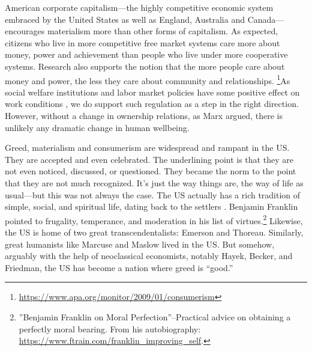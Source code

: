 \documentclass[10pt, letterpaper]{article}
\providecommand{\DIFaddtex}[1]{{\protect\color{blue}\uwave{#1}}} %
\providecommand{\DIFaddbegin}{} %
\providecommand{\DIFaddend}{} %
\providecommand{\DIFadd}[1]{\texorpdfstring{\DIFaddtex{#1}}{#1}} %
\newcommand{\DIFaddincludegraphics}[2][]{{\color{blue}\fbox{\DIFOincludegraphics[#1]{#2}}}} %
\DeclareRobustCommand{\DIFaddbegin}{\DIFOaddbegin \let\includegraphics\DIFaddincludegraphics} %
\DeclareRobustCommand{\DIFaddend}{\DIFOaddend \let\includegraphics\DIFOincludegraphics} %
\begin{document}
\begin{spacing}{1.8}
American corporate capitalism---the highly competitive economic system embraced by the United States as well as England, Australia and Canada---encourages
materialism more than other forms of capitalism.
%
As expected, citizens who live in more competitive free market systems care more about money, power and achievement than people who live under more cooperative systems. Research also supports the notion that the more people care about money and power, the less they care about community and relationships.
\footnote{\url{https://www.apa.org/monitor/2009/01/consumerism}}\DIFaddbegin \DIFadd{.
 }\DIFaddend As social welfare institutions and labor market policies have some positive
 effect on work conditions \citep{inanc20}, we do support such regulation as a step in the
 right direction. However, without a change in ownership relations,
 as Marx argued, there is unlikely any dramatic change in human wellbeing. %


Greed, materialism and consumerism are widespread and rampant in the US. They
are accepted and even celebrated. The underlining point is that they are not even
noticed, discussed, or questioned. They became the norm to the point
that they are not much recognized. It's just the way things are, the way of life
as usual---but this was not always the case. The US actually has a rich
tradition of simple, social, and spiritual life, dating back to the settlers
\cite{fischer91}. Benjamin Franklin pointed to frugality, temperance, and
moderation in his list of virtues.\footnote{''Benjamin Franklin on Moral
  Perfection''--Practical advice on obtaining a perfectly moral bearing. From
  his autobiography: \url{https://www.ftrain.com/franklin_improving_self}.}
Likewise,  the US is home of two great transcendentalists: Emerson and Thoreau.
Similarly, great humanists like Marcuse and Maslow lived in the US. But somehow, arguably with the help of neoclassical economists, notably Hayek, Becker, and Friedman, the US has become a nation where greed is ``good.''


\end{spacing}
\end{document}

